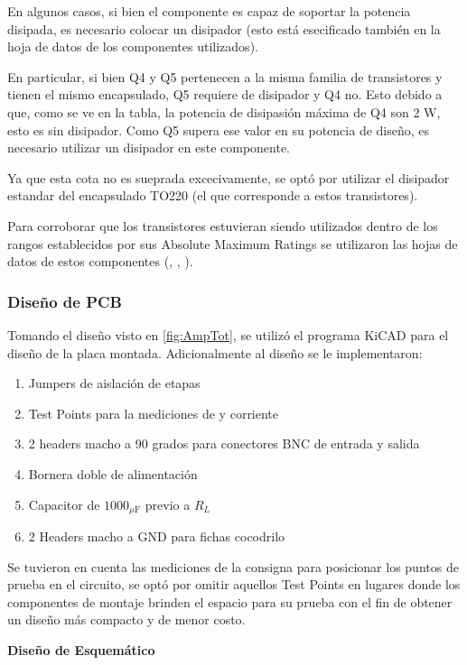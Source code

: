 En algunos casos, si bien el componente es capaz de soportar la potencia disipada, es necesario colocar un disipador (esto está esecificado también en la hoja de datos de los componentes utilizados).

En particular, si bien Q4 y Q5 pertenecen a la misma familia de transistores y tienen el mismo encapsulado, Q5 requiere de disipador y Q4 no. Esto debido a que, como se ve en la tabla, la potencia de disipasión máxima de Q4 son 2 W, esto es sin disipador. Como Q5 supera ese valor en su potencia de diseño, es necesario utilizar un disipador en este componente.

Ya que esta cota no es sueprada excecivamente, se optó por utilizar el disipador estandar del encapsulado TO220 (el que corresponde a estos transistores).

Para corroborar que los transistores estuvieran siendo utilizados dentro de los rangos establecidos por sus Absolute Maximum Ratings se utilizaron las hojas de datos de estos componentes (\cite{tip122}, \cite{bd139}, \cite{bc546}).

\subsubsection{Diseño de PCB}

  Tomando el diseño visto en \cref{fig:AmpTot}, se utilizó el programa KiCAD para el diseño de la placa montada. Adicionalmente al diseño se le implementaron:
\begin{enumerate}
  \item Jumpers de aislación de etapas
  \item Test Points para la mediciones de  y corriente
  \item 2 headers macho a 90 grados para conectores BNC de entrada y salida
  \item Bornera doble de alimentación
  \item Capacitor de $1000_{\mu \text{F}}$ previo a $R_L$
  \item 2 Headers macho a GND para fichas cocodrilo
\end{enumerate}

Se tuvieron en cuenta las mediciones de la consigna para posicionar los puntos de prueba en el circuito, se optó por omitir aquellos Test Points en lugares donde los componentes de montaje brinden el espacio para su prueba con el fin de obtener un diseño más compacto y de menor costo.

\vspace{0.5em}
{\small\textbf{Diseño de Esquemático}}

